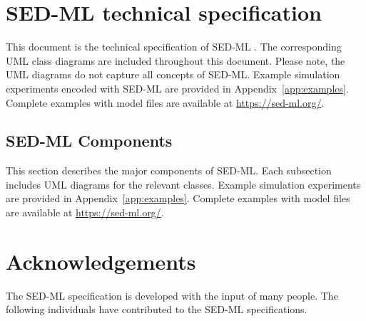 \documentclass[pdftex,rgb,dvipsnames,svgnames,hyperref,table]{report}
\begin{document}

\sedmltableofcontents
\newpage


\chapter{SED-ML technical specification}
\label{chp:specification}
This document is the technical specification of SED-ML \currentLV. The corresponding UML class diagrams are included throughout this document. Please note, the UML diagrams do not capture all concepts of SED-ML. Example simulation experiments encoded with SED-ML are provided in Appendix~\ref{app:examples}. Complete examples with model files are available at \url{https://sed-ml.org/}.





\pagebreak
\section{SED-ML Components}
\label{sec:components}
This section describes the major components of SED-ML. Each subsection includes UML diagrams for the relevant classes.  Example simulation experiments are provided in Appendix~\ref{app:examples}. Complete examples with model files are available at \url{https://sed-ml.org/}.%












\chapter{Acknowledgements}
\label{chp:acknowledgments}
The SED-ML specification is developed with the input of many people. The following individuals have contributed to the SED-ML specifications.
\end{document}
